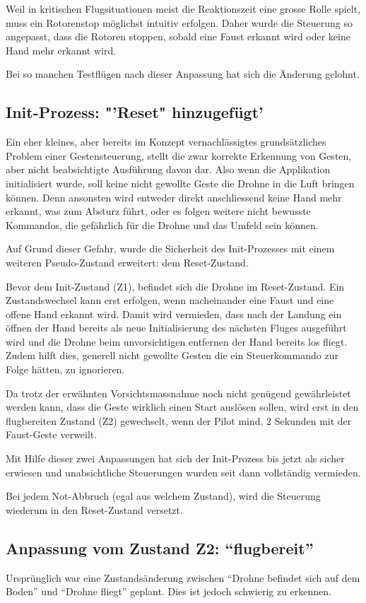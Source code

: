 Weil in kritischen Flugsituationen meist die Reaktionszeit eine grosse Rolle spielt, muss ein Rotorenstop möglichst intuitiv erfolgen.
Daher wurde die Steuerung so angepasst, dass die Rotoren stoppen, sobald eine Faust erkannt wird oder keine Hand mehr erkannt wird.

Bei so manchen Testflügen nach dieser Anpassung hat sich die Änderung gelohnt.

\subsection{Init-Prozess: "'Reset" hinzugefügt'}
Ein eher kleines, aber bereits im Konzept vernachlässigtes grundsätzliches Problem einer Gestensteuerung, stellt die zwar korrekte Erkennung von Gesten, aber nicht beabsichtigte Ausführung davon dar.
Also wenn die Applikation initialisiert wurde, soll keine nicht gewollte  Geste die Drohne in die Luft bringen können.
Denn ansonsten wird entweder direkt anschliessend keine Hand mehr erkannt, was zum Absturz führt, oder es folgen weitere nicht bewusste Kommandos, die gefährlich für die Drohne und das Umfeld sein können.

Auf Grund dieser Gefahr, wurde die Sicherheit des Init-Prozesses mit einem weiteren Pseudo-Zustand erweitert: dem Reset-Zustand.

Bevor dem Init-Zustand (Z1), befindet sich die Drohne im Reset-Zustand. Ein Zustandswechsel kann erst erfolgen, wenn nacheinander eine Faust und eine offene Hand erkannt wird. Damit wird vermieden, dass nach der Landung ein öffnen der Hand bereits als neue Initialisierung des nächsten Fluges ausgeführt wird und die Drohne beim unvorsichtigen entfernen der Hand bereits los fliegt.
Zudem hilft dies, generell nicht gewollte Gesten die ein Steuerkommando zur Folge hätten, zu ignorieren.

Da trotz der erwähnten Vorsichtsmassnahme noch nicht genügend gewährleistet werden kann, dass die Geste wirklich einen Start auslösen sollen, wird erst in den flugbereiten Zustand (Z2) gewechselt, wenn der Pilot mind. 2 Sekunden mit der Faust-Geste verweilt.

Mit Hilfe dieser zwei Anpassungen hat sich der Init-Prozess bis jetzt als sicher erwiesen und unabsichtliche Steuerungen wurden seit dann vollständig vermieden.

Bei jedem Not-Abbruch (egal aus welchem Zustand), wird die Steuerung wiederum in den Reset-Zustand versetzt.

\subsection{Anpassung vom Zustand Z2: "`flugbereit"'}
Ursprünglich war eine Zustandsänderung zwischen "`Drohne befindet sich auf dem Boden"' und "`Drohne fliegt"' geplant. Dies ist jedoch schwierig zu erkennen.

